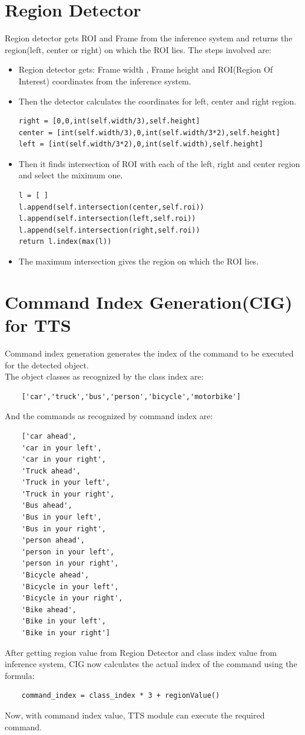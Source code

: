         \section{Region Detector}
        Region detector gets ROI and Frame from the inference system and returns the region(left, center or right) on which the ROI lies.
        The steps involved are:
            \begin{itemize} 
                \item Region detector gets: Frame width , Frame height and  ROI(Region Of Interest) coordinates from the inference system.
                \item Then the detector calculates the coordinates for left, center and right region.
\begin{verbatim}
right = [0,0,int(self.width/3),self.height]
center = [int(self.width/3),0,int(self.width/3*2),self.height]
left = [int(self.width/3*2),0,int(self.width),self.height]
\end{verbatim}
                \item Then it finds intersection of ROI with each of the left, right and center region and select the miximum one.
\begin{verbatim}
l = [ ]
l.append(self.intersection(center,self.roi))
l.append(self.intersection(left,self.roi))
l.append(self.intersection(right,self.roi))
return l.index(max(l))
\end{verbatim}
                \item The maximum intersection gives the region on which the ROI lies.
            \end{itemize}
        \section{Command Index Generation(CIG) for TTS}
            Command index generation generates the index of the command to be executed for the detected object.\\The object classes as recognized by the class index are:
\begin{verbatim}
    ['car','truck','bus','person','bicycle','motorbike']      
\end{verbatim}
            And the commands as recognized by command index are:
\begin{verbatim}
    ['car ahead',
    'car in your left',
    'car in your right',
    'Truck ahead',
    'Truck in your left',
    'Truck in your right',
    'Bus ahead',
    'Bus in your left',
    'Bus in your right', 
    'person ahead', 
    'person in your left', 
    'person in your right',
    'Bicycle ahead', 
    'Bicycle in your left',
    'Bicycle in your right', 
    'Bike ahead', 
    'Bike in your left',
    'Bike in your right']
\end{verbatim}
            After getting region value from Region Detector and class index value from inference system, CIG now calculates the actual index of the command using the formula:
\begin{verbatim}
    command_index = class_index * 3 + regionValue()
\end{verbatim}
            Now, with command index value, TTS module can execute the required command.

